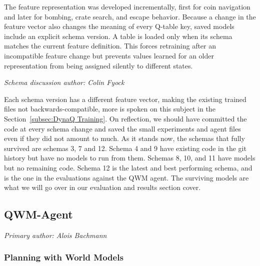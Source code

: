 \documentclass[article, 10pt]{IEEEtran}
\begin{document}
The feature representation was developed incrementally, first for coin navigation and later for bombing, crate search, and escape behavior. Because a change in the feature vector also changes the meaning of every Q-table key, saved models include an explicit schema version. A table is loaded only when its schema matches the current feature definition. This forces retraining after an incompatible feature change but prevents values learned for an older representation from being assigned silently to different states.

\textit{Schema discussion author: Colin Fyock}

Each schema version has a different feature vector, making the existing trained files not backwards-compatible, more is spoken on this subject in the Section~\ref{subsec:DynaQ Training}. On reflection, we should have committed the code at every schema change and saved the small experiments and agent files even if they did not amount to much. As it stands now, the schemas that fully survived are schemas 3, 7 and 12. Schema 4 and 9 have existing code in the git history but have no models to run from them. Schemas 8, 10, and 11 have models but no remaining code. Schema 12 is the latest and best performing schema, and is the one in the evaluations against the QWM agent. The surviving models are what we will go over in our evaluation and results section cover.


\subsection{QWM-Agent}\label{sec:qwm_agent} %

\textit{Primary author: Alois Bachmann}

\subsubsection{Planning with World Models}
\end{document}

